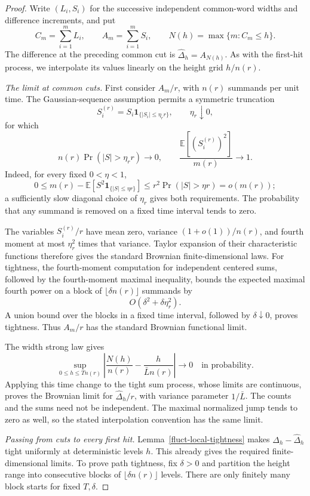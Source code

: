 \begin{proof}
Write \((L_i,S_i)\) for the successive independent common-word widths
and difference increments, and put
\[
 C_m=\sum_{i=1}^mL_i,\qquad A_m=\sum_{i=1}^mS_i,
 \qquad N(h)=\max\{m:C_m\le h\}.
\]
The difference at the preceding common cut is
\(\widehat\Delta_h=A_{N(h)}\). As with the first-hit process, we
interpolate its values linearly on the height grid \(h/n(r)\).

\emph{The limit at common cuts.}
First consider \(A_m/r\), with \(n(r)\) summands per unit time.
The Gaussian-sequence assumption permits a symmetric truncation
\[
 S_i^{(r)}=S_i\mathbf1_{\{|S_i|\le\eta_r r\}},
 \qquad \eta_r\downarrow0,
\]
for which
\[
 n(r)\Pr(|S|>\eta_r r)\longrightarrow0,
 \qquad
 \frac{\mathbb E[(S_i^{(r)})^2]}{m(r)}\longrightarrow1.
\]
Indeed, for every fixed \(0<\eta<1\),
\[
 0\le m(r)-\mathbb E[S^2\mathbf1_{\{|S|\le\eta r\}}]
 \le r^2\Pr(|S|>\eta r)=o(m(r));
\]
a sufficiently slow diagonal choice of \(\eta_r\) gives both
requirements. The probability that any summand is removed on a fixed
time interval tends to zero.

The variables \(S_i^{(r)}/r\) have mean zero, variance
\((1+o(1))/n(r)\), and fourth moment at most \(\eta_r^2\) times
that variance. Taylor expansion of their characteristic functions
therefore gives the standard Brownian finite-dimensional laws. For
tightness, the fourth-moment computation for independent centered sums,
followed by the fourth-moment maximal inequality, bounds the expected
maximal fourth power on a block of \(\lfloor\delta n(r)\rfloor\)
summands by
\[
 O(\delta^2+\delta\eta_r^2).
\]
A union bound over the blocks in a fixed time interval, followed by
\(\delta\downarrow0\), proves tightness. Thus \(A_m/r\) has the
standard Brownian functional limit.

The width strong law gives
\[
 \sup_{0\le h\le Tn(r)}
 \left|\frac{N(h)}{n(r)}-\frac{h}{\bar L n(r)}\right|
 \longrightarrow0
 \quad\text{in probability}.
\]
Applying this time change to the tight sum process, whose limits are
continuous, proves the Brownian limit for
\(\widehat\Delta_h/r\), with variance parameter \(1/\bar L\).
The counts and the sums need not be independent. The maximal normalized
jump tends to zero as well, so the stated interpolation convention has
the same limit.

\emph{Passing from cuts to every first hit.}
Lemma~\ref{fluct-local-tightness} makes
\(\Delta_h-\widehat\Delta_h\) tight uniformly at deterministic
levels \(h\). This already gives the required finite-dimensional
limits. To prove path tightness, fix \(\delta>0\) and partition the
height range into consecutive blocks of
\(\lfloor\delta n(r)\rfloor\) levels. There are only finitely many
block starts for fixed \(T,\delta\).


\end{proof}
